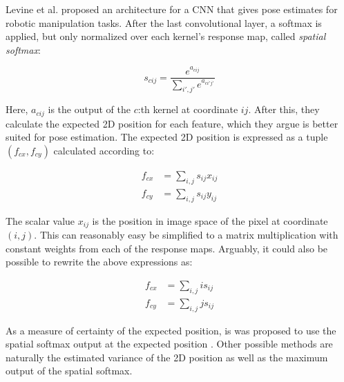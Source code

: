 Levine et al. \cite{levine2016end} proposed an architecture for a CNN that
gives pose estimates for robotic manipulation tasks. After the last
convolutional layer, a softmax is applied, but only normalized over each
kernel's response map, called \textit{spatial softmax}:

\begin{equation}
    s_{cij} = \frac{e^{a_{cij}}}{\sum_{i',j'} e^{a_{ci'j'}}}
\end{equation}

Here, $a_{cij}$ is the output of the $c$:th kernel at coordinate $ij$. After
this, they calculate the expected 2D position for each feature, which they
argue is better suited for pose estimation. The expected 2D position is
expressed as a tuple $(f_{cx}, f_{cy})$ calculated according to:

\begin{align}
    f_{cx} &= \sum_{i,j} s_{ij} x_{ij} \\
    f_{cy} &= \sum_{i,j} s_{ij} y_{ij}
\end{align}

The scalar value $x_{ij}$ is the position in image space of the pixel at coordinate
$(i, j)$. This can reasonably easy be simplified to a matrix multiplication with constant
weights from each of the response maps. Arguably, it could also be possible to rewrite the
above expressions as:

\begin{align}
    f_{cx} &= \sum_{i,j} i s_{ij} \\
    f_{cy} &= \sum_{i,j} j s_{ij}
\end{align}

As a measure of certainty of the expected position, is was proposed to use the
spatial softmax output at the expected position \cite{finn2016deep2}. Other
possible methods are naturally the estimated variance of the 2D position as
well as the maximum output of the spatial softmax.
